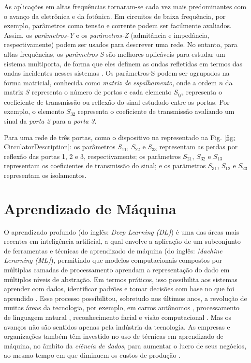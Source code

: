 As aplicações em altas frequências tornaram-se cada vez mais predominantes com o avanço da eletrônica e da fotônica. Em circuitos de baixa frequência, por exemplo, parâmetros como tensão e corrente podem ser facilmente avaliados. Assim, os \textit{parâmetros-Y} e os \textit{parâmetros-Z} (admitância e impedância, respectivamente) podem ser usados para descrever uma rede. No entanto, para altas frequências, os \textit{parâmetros-S} são melhores aplicáveis para estudar um sistema multiporta, de forma que eles definem as ondas refletidas em termos das ondas incidentes nesses sistemas \cite{pupalaikis_2020}. Os parâmetros-S podem ser agrupados na forma matricial, conhecida como \textit{matriz de espalhamento}, onde a ordem $n$ da matriz $S$ representa o número de portas e cada elemento $S_{ij}$, representa o coeficiente de transmissão ou reflexão do sinal estudado entre as portas. Por exemplo, o elemento $S_{32}$ representa o coeficiente de transmissão avaliando um sinal da \textit{porta 2} para a \textit{porta 3}.

Para uma rede de três portas, como o dispositivo na representado na Fig. \ref{fig: CirculatorDescription}: os parâmetros $S_{11}$, $S_{22}$ e $S_{33}$ representam as perdas por reflexão das portas 1, 2 e 3, respectivamente; os parâmetros $S_{21}$, $S_{32}$ e $S_{13}$ representam os coeficientes de transmissão do sinal; e os parâmetros $S_{31}$, $S_{12}$ e $S_{23}$ representam os isolamentos.


\section{Aprendizado de Máquina}      \label{Machine Learning}

O aprendizado profundo (do inglês: \textit{Deep Learning (DL)}) é uma das áreas mais recentes em inteligência artificial, a qual envolve a aplicação de um subconjunto de ferramentas e técnicas de aprendizado de máquina (do inglês: \textit{Machine Lerarning (ML)}), permitindo que modelos computacionais compostos por múltiplas camadas de processamento aprendam a representação do dado em múltiplos níveis de abstração. Em termos práticos, isso possibilita aos sistemas aprender com dados, identificar padrões e tomar decisões com base no que foi aprendido \cite{goodfellow2016deep}. Esse processo possibilitou, sobretudo nos últimos anos, a revolução de muitas áreas da tecnologia, por exemplo, em carros autônomos \cite{al2017deep}, processamento de linguagem natural \cite{socher2013recursive}, reconhecimento facial e visão computacional \cite{krizhevsky2012imagenet}. Mas os avanços não são sentidos apenas pela indústria da tecnologia. As empresas e organizações também têm investido no uso de técnicas em aprendizado de máquina, no âmbito da \textit{ciência de dados}, para aumentar o lucro de seus negócios, ao mesmo tempo em que diminuem os custos de produção \cite{patil2015data,aggarwal2018neural}.

